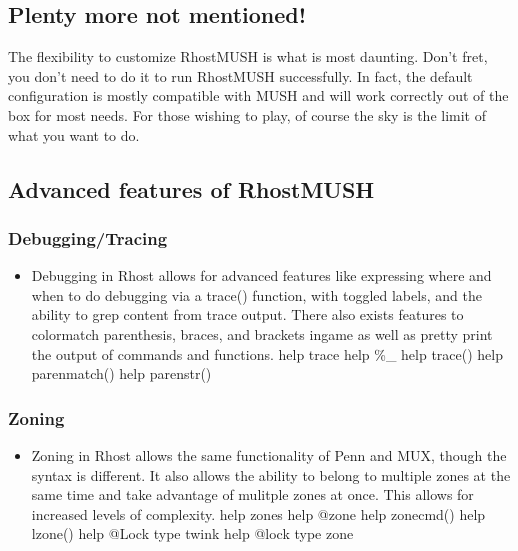 \documentclass[letterpaper,10pt,english]{sphinxmanual}
\begin{document}
\subsection{Plenty more not mentioned!}
\label{\detokenize{features:plenty-more-not-mentioned}}
\sphinxAtStartPar
The flexibility to customize RhostMUSH is what is most daunting.
Don’t fret, you don’t need to do it to run RhostMUSH successfully.
In fact, the default configuration is mostly compatible with
MUSH and will work correctly out of the box for most needs.  For those
wishing to play, of course the sky is the limit of what you want to
do.


\subsection{Advanced features of RhostMUSH}
\label{\detokenize{features:advanced-features-of-rhostmush}}

\subsubsection{Debugging/Tracing}
\label{\detokenize{features:debugging-tracing}}\begin{itemize}
\item {} 
\sphinxAtStartPar
Debugging in Rhost allows for advanced features like expressing where and
when to do debugging via a trace() function, with toggled labels, and the
ability to grep content from trace output.  There also exists features to
color\sphinxhyphen{}match parenthesis, braces, and brackets in\sphinxhyphen{}game as well as pretty print
the output of commands and functions.
\sphinxhyphen{} help trace
\sphinxhyphen{} help \%\_
\sphinxhyphen{} help trace()
\sphinxhyphen{} help parenmatch()
\sphinxhyphen{} help parenstr()

\end{itemize}


\subsubsection{Zoning}
\label{\detokenize{features:zoning}}\begin{itemize}
\item {} 
\sphinxAtStartPar
Zoning in Rhost allows the same functionality of Penn and MUX, though the
syntax is different.  It also allows the ability to belong to multiple
zones at the same time and take advantage of mulitple zones at once.
This allows for increased levels of complexity.
\sphinxhyphen{} help zones
\sphinxhyphen{} help @zone
\sphinxhyphen{} help zonecmd()
\sphinxhyphen{} help lzone()
\sphinxhyphen{} help @Lock type twink
\sphinxhyphen{} help @lock type zone

\end{itemize}
\end{document}
